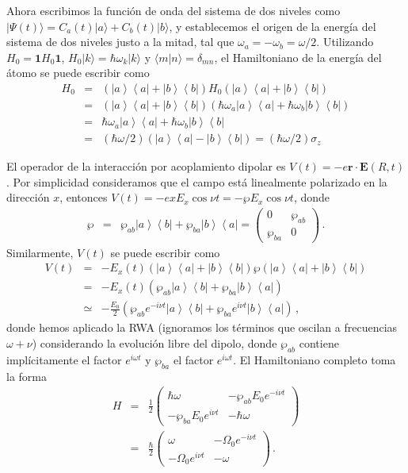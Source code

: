 \documentclass[twocolumn,aps,eqsecnum]{revtex4}
\newcommand{\mbr}{\mathbf{r}}
\newcommand{\mbE}{\mathbf{E}}
\providecommand{\ket}[1]{\lvert #1 \rangle}
\providecommand{\braket}[2]{\langle #1 \rvert #2 \rangle}
\newcommand{\ketbra}[2]{\left| {#1} \right\rangle\left\langle {#2}\right|}
\begin{document}
Ahora escribimos la funci\'on de onda del sistema de dos niveles como 
$\ket{\Psi (t)} = C_a (t) \ket{a} + C_b (t) \ket{b}$, y establecemos 
el origen de la energ\'ia del sistema de dos niveles justo a la mitad, 
tal que $\omega_a = - \omega_b = \omega /2$. Utilizando 
$H_0 = \mathbf{1} H_0 \mathbf{1}$, $H_0 \ket{k} = \hbar \omega_k \ket{k}$ 
y $\braket{m}{n} = \delta_{mn}$, el Hamiltoniano de la energ\'ia del \'atomo 
se puede escribir como
%
\begin{eqnarray*} 
H_0 &=& (\ketbra{a}{a} + \ketbra{b}{b}) H_0 
 	( \ketbra{a}{a} + \ketbra{b}{b} ) 		\\ 
&=& (\ketbra{a}{a} + \ketbra{b}{b}) 
 ( \hbar \omega_a  \ketbra{a}{a} + \hbar \omega_b  \ketbra{b}{b} ) \\ 
&=& \hbar \omega_a  \ketbra{a}{a} 
    +\hbar \omega_b  \ketbra{b}{b} \\  
&=& (\hbar \omega /2)( \ketbra{a}{a} - \ketbra{b}{b} ) 
	= (\hbar \omega /2) \sigma_z
\end{eqnarray*}

El operador de la interacci\'on por acoplamiento dipolar es 
$V(t) = -e \mbr \cdot \mbE (R,t)$. Por simplicidad 
consideramos que el campo est\'a linealmente polarizado en la 
direcci\'on $x$, entonces 
$V(t) = -e x E_x \cos{\nu t} = - \wp E_x \cos{\nu t} $, donde 
%
\begin{eqnarray*}
\wp &=& \wp_{ab} \ketbra{a}{b} +\wp_{ba} \ketbra{b}{a} 
  = \left( \begin{array}{cc} 0& \wp_{ab}  \\ \wp_{ba} &0 
\end{array} \right) \,.  
\end{eqnarray*}
Similarmente, $V(t)$ se puede escribir como
%
\begin{eqnarray*} 
V(t) &=& - E_x(t) (\ketbra{a}{a} + \ketbra{b}{b}) \wp 
 	( \ketbra{a}{a} + \ketbra{b}{b} ) 		\\ 
&=& -E_x(t) (\wp_{ab} \ketbra{a}{b} + \wp_{ba} \ketbra{b}{a} ) \\  
&\simeq& - \frac{E_0}{2}  \left( \wp_{ab} e^{-i \nu t} \ketbra{a}{b}  
	+ \wp_{ba} e^{i \nu t} \ketbra{b}{a}  \right) \,,
\end{eqnarray*}
donde hemos aplicado la RWA (ignoramos los t\'erminos que oscilan a 
frecuencias $\omega + \nu$) considerando la evoluci\'on libre del dipolo, 
donde $\wp_{ab}$ contiene impl\'icitamente el factor $e^{i \omega t}$ y 
$\wp_{ba}$ el factor $e^{i \omega t}$.  El Hamiltoniano completo 
toma la forma  
%
\begin{eqnarray*}
H &=& \frac{1}{2} 
\left( \begin{array}{cc}  \hbar \omega & -\wp_{ab} E_0 e^{-i \nu t} \\ 
	- \wp_{ba} E_0 e^{i \nu t} &- \hbar \omega  \end{array} \right) 	\\ 
&=& \frac{\hbar}{2} 
\left( \begin{array}{cc}  \omega & - \Omega_0 e^{-i \nu t} \\ 
	- \Omega_0 e^{i \nu t} & - \omega  \end{array} \right) \,.
\end{eqnarray*}
\end{document}
